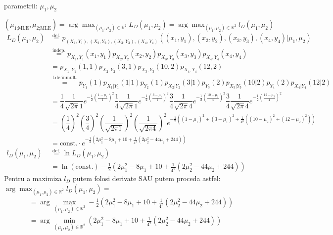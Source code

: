 \documentclass[12pt]{article}
\begin{document}
\begin{enumerate}
		parametrii: $\mu_1, \mu_2$
		
		$(\mu_\text{1;MLE},\mu_\text{2;MLE}) = \arg \max_{(\mu_1,\mu_2) \in \mathbb{R}^2} L_D(\mu_1,\mu_2) = \arg \max_{(\mu_1,\mu_2) \in \mathbb{R}^2} l_D(\mu_1,\mu_2)$
		\begin{align*}
		L_D(\mu_1,\mu_2) &\stackrel{\text{def.}}{=} p_{(X_1,Y_1),(X_2,Y_2),(X_3,Y_3),(X_4,Y_4)}((x_1,y_1),(x_2,y_2),(x_3,y_3),(x_4,y_4)|\mu_1,\mu_2)\\
		&\stackrel{\text{indep.}}{=} p_{X_1,Y_1}(x_1,y_1) p_{X_2,Y_2}(x_2,y_2) p_{X_3,Y_3}(x_3,y_3) p_{X_4,Y_4}(x_4,y_4)\\
		&=p_{X_1,Y_1}(1,1) p_{X_2,Y_2}(3,1) p_{X_3,Y_3}(10,2) p_{X_4,Y_4}(12,2)\\
		&\stackrel{\text{f.de înmulț.}}{=} p_{Y_1}(1) p_{X_1|Y_1}(1|1)  p_{Y_2}(1) p_{X_2|Y_2}(3|1)  p_{Y_3}(2) p_{X_3|Y_3}(10|2)  p_{Y_4}(2) p_{X_4|Y_4}(12|2)\\
		&=\dfrac{1}{4} \dfrac{1}{\sqrt{2\pi}1} e^{-\frac{1}{2}\left(\frac{1-\mu_1}{1}\right)^2}
		\dfrac{1}{4} \dfrac{1}{\sqrt{2\pi}1} e^{-\frac{1}{2}\left(\frac{3-\mu_1}{1}\right)^2}
		\dfrac{3}{4} \dfrac{1}{\sqrt{2\pi}4} e^{-\frac{1}{2}\left(\frac{10-\mu_2}{4}\right)^2}
		\dfrac{3}{4} \dfrac{1}{\sqrt{2\pi}4} e^{-\frac{1}{2}\left(\frac{12-\mu_2}{4}\right)^2}\\
		&=\left(\dfrac{1}{4}\right)^2 \left(\dfrac{3}{4}\right)^2 \left(\dfrac{1}{\sqrt{2\pi 1}}\right)^2 \left(\dfrac{1}{\sqrt{2\pi 4}}\right)^2 e^{-\frac{1}{2}\left((1-\mu_1)^2 + (3-\mu_1)^2 + \frac{1}{4^2} \left(\left({10-\mu_2}\right)^2 + \left({12-\mu_2}\right)^2\right) \right)}\\
		&=\text{const.}\cdot e^{-\frac{1}{2}\left(2\mu_1^2 - 8\mu_1 + 10 + \frac{1}{4^2} \left(2\mu_2^2 - 44\mu_2 + 244\right) \right)}\\
		l_D(\mu_1,\mu_2) &\stackrel{\text{def.}}{=} \ln L_D(\mu_1,\mu_2)\\
		& =\ln(\text{const.}) - \frac{1}{2}\left(2\mu_1^2 - 8\mu_1 + 10 + \frac{1}{4^2} \left(2\mu_2^2 - 44\mu_2 + 244\right) \right)
		\end{align*}
		Pentru a maximiza $l_D$ putem folosi derivate SAU putem proceda astfel:
		$\arg \max_{(\mu_1,\mu_2)\in \mathbb{R}^2} l_D(\mu_1,\mu_2) =$
		\begin{align*}
		&= \arg \max_{(\mu_1,\mu_2)\in \mathbb{R}^2}  - \frac{1}{2}\left(2\mu_1^2 - 8\mu_1 + 10 + \frac{1}{4^2} \left(2\mu_2^2 - 44\mu_2 + 244\right) \right)\\
		&=\arg \min_{(\mu_1,\mu_2)\in \mathbb{R}^2} \left(2\mu_1^2 - 8\mu_1 + 10 + \frac{1}{4^2} \left(2\mu_2^2 - 44\mu_2 + 244\right) \right)\\

\end{align*}
\end{enumerate}
\end{document}
